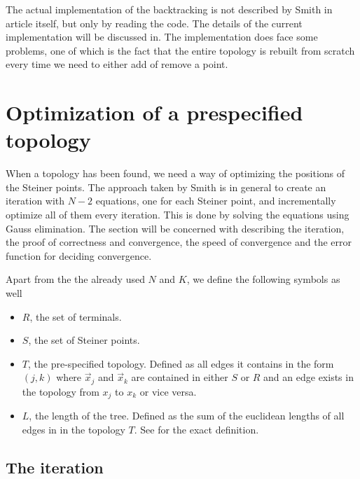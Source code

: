 The actual implementation of the backtracking is not described by Smith in
article itself, but only by reading the code.  The details of the current
implementation will be discussed in.  The implementation does face some problems, one of which is
the fact that the entire topology is rebuilt from scratch every time we need to
either add of remove a point.

\section{Optimization of a prespecified topology}
\label{sec:optim-presp-topol}

When a topology has been found, we need a way of optimizing the positions of the
Steiner points.  The approach taken by Smith is in general to create an
iteration with $N-2$ equations, one for each Steiner point, and incrementally
optimize all of them every iteration.  This is done by solving the equations
using Gauss elimination.  The section will be concerned with describing the
iteration, the proof of correctness and convergence, the speed of convergence
and the error function for deciding convergence.

Apart from the the already used $N$ and $K$, we define the following symbols as
well
\begin{itemize}
\item $R$, the set of terminals.
\item $S$, the set of Steiner points.
\item $T$, the pre-specified topology.  Defined as all edges it contains in the
form $(j,k)$ where $\vec x_j$ and $\vec x_k$ are contained in either $S$ or $R$
and an edge exists in the topology from $x_j$ to $x_k$ or vice versa.
\item $L$, the length of the tree.  Defined as the sum of the euclidean lengths
of all edges in in the topology $T$.  See  for the exact
definition.
\end{itemize}


\subsection{The iteration}
\label{sec:iteration}

